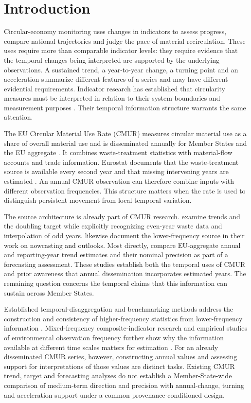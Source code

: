 \section{Introduction}

Circular-economy monitoring uses changes in indicators to assess progress, compare national trajectories and judge the pace of material recirculation. These uses require more than comparable indicator levels: they require evidence that the temporal changes being interpreted are supported by the underlying observations. A sustained trend, a year-to-year change, a turning point and an acceleration summarize different features of a series and may have different evidential requirements. Indicator research has established that circularity measures must be interpreted in relation to their system boundaries and measurement purposes \parencite{Saidani2019,Moraga2019}. Their temporal information structure warrants the same attention.

The EU Circular Material Use Rate (CMUR) measures circular material use as a share of overall material use and is disseminated annually for Member States and the EU aggregate \parencite{Eurostat2018,EEAIndicator2026}. It combines waste-treatment statistics with material-flow accounts and trade information. Eurostat documents that the waste-treatment source is available every second year and that missing intervening years are estimated \parencite{EurostatMetadata2026}. An annual CMUR observation can therefore combine inputs with different observation frequencies. This structure matters when the rate is used to distinguish persistent movement from local temporal variation.

The source architecture is already part of CMUR research. \textcite{Christis2023} examine trends and the doubling target while explicitly recognizing even-year waste data and interpolation of odd years. \textcite{Nuss2024Nowcasting} likewise document the lower-frequency source in their work on nowcasting and outlooks. Most directly, \textcite{Haider2026} compare EU-aggregate annual and reporting-year trend estimates and their nominal precision as part of a forecasting assessment. These studies establish both the temporal uses of CMUR and prior awareness that annual dissemination incorporates estimated years. The remaining question concerns the temporal claims that this information can sustain across Member States.

Established temporal-disaggregation and benchmarking methods address the construction and consistency of higher-frequency statistics from lower-frequency information \parencite{ESS2018,Quilis2018}. Mixed-frequency composite-indicator research and empirical studies of environmental observation frequency further show why the information available at different time scales matters for estimation \parencite{Mattera2023,CortesGuzman2026}. For an already disseminated CMUR series, however, constructing annual values and assessing support for interpretations of those values are distinct tasks. Existing CMUR trend, target and forecasting analyses do not establish a Member-State-wide comparison of medium-term direction and precision with annual-change, turning and acceleration support under a common provenance-conditioned design.

